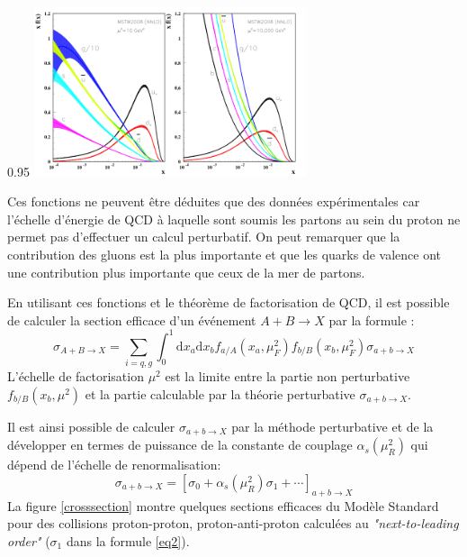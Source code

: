 \begin{minipagewithmarginpars}[ht!]{0.95\textwidth}
	\centering
	\includegraphics[width=0.6\textwidth]{LHC/pdf.png}
	\label{pdf}	
\end{minipagewithmarginpars}
 
Ces fonctions ne peuvent être déduites que des données expérimentales car l'échelle d'énergie de QCD à laquelle sont soumis les partons au sein du proton ne permet pas d'effectuer un calcul perturbatif. On peut remarquer que la contribution des gluons est la plus importante et que les quarks de valence ont une contribution plus importante que ceux de la mer de partons.

En utilisant ces fonctions et le théorème de factorisation de QCD, il est possible de calculer la section efficace d'un événement $A+B\rightarrow X$ par la formule :
\begin{equation}
\sigma_{A+B\rightarrow X}=\sum_{i=q,g}\int_{0}^{1} \mathrm{d}x_{a}\mathrm{d}x_{b}f_{a/A}(x_{a},\mu_{F}^{2})f_{b/B}(x_{b},\mu_{F}^{2})\sigma{_{a+b\rightarrow X}}
\end{equation}
L'échelle de factorisation $\mu^{2}$ est la limite entre la partie non perturbative $f_{b/B}(x_{b},\mu^{2})$ et la partie calculable par la théorie perturbative $\sigma{_{a+b\rightarrow X}}$.

Il est ainsi possible de calculer $\sigma{_{a+b\rightarrow X}}$ par la méthode perturbative et de la développer en termes de puissance de la constante de couplage $\alpha_{s}\left(\mu_{R}^{2}\right)$ qui dépend de l'échelle de renormalisation:
\begin{equation}
\sigma_{a+b\rightarrow X}=\left[\sigma_{0}+\alpha_{s}\left(\mu_{R}^{2}\right)\sigma_{1}+\cdots\right]_{a+b\rightarrow X}
\label{eq2}
\end{equation}
La figure \ref{crosssection} montre quelques sections efficaces du Modèle Standard pour des collisions proton-proton, proton-anti-proton calculées au \textit{"next-to-leading order"} ($\sigma_{1}$ dans la formule \ref{eq2}).


